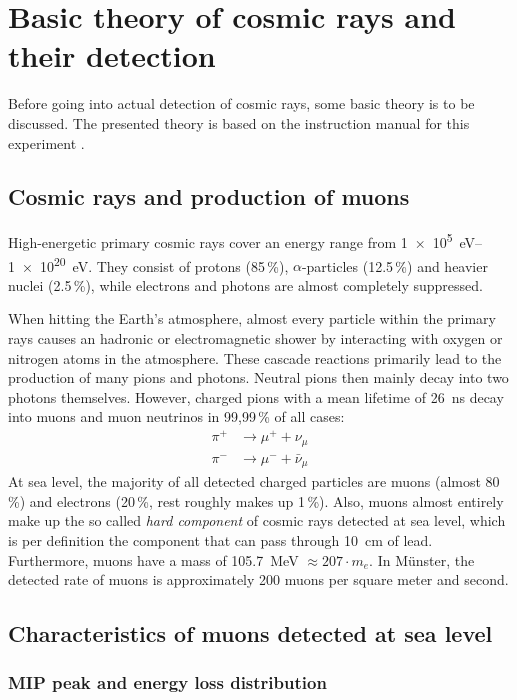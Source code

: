 \section{Basic theory of cosmic rays and their detection}
	
	Before going into actual detection of cosmic rays, some basic theory is to be discussed. The presented theory is based on the instruction manual for this experiment \cite{wwu}.
	

\subsection{Cosmic rays and production of muons}

High-energetic primary cosmic rays cover an energy range from \SIrange{1e5}{1e20}{\electronvolt}.
They consist of protons (85\,\%), $\alpha$-particles (12.5\,\%) and heavier nuclei (2.5\,\%), while electrons and photons are almost completely suppressed.

When hitting the Earth's atmosphere, almost every particle within the primary rays causes an hadronic or electromagnetic shower by interacting with oxygen or nitrogen atoms in the atmosphere.
These cascade reactions primarily lead to the production of many pions and photons.
Neutral pions then mainly decay into two photons themselves.
However, charged pions with a mean lifetime of \SI{26}{\nano\second}\cite{pdg} decay into muons and muon neutrinos in 99,99\,\% of all cases:
\begin{align}
	\pi^+&\longrightarrow \mu^++\nu_\mu\\
	\pi^-&\longrightarrow \mu^-+\bar{\nu}_\mu
\end{align}
At sea level, the majority of all detected charged particles are muons (almost 80\,\%) and electrons (20\,\%, rest roughly makes up 1\,\%).
Also, muons almost entirely make up the so called \emph{hard component} of cosmic rays detected at sea level, which is per definition the component that can pass through \SI{10}{\centi\meter} of lead.
Furthermore, muons have a mass of \SI{105.7}{\mega\electronvolt} $\approx 207 \cdot m_e$.
In Münster, the detected rate of muons is approximately 200 muons per square meter and second.

\subsection{Characteristics of muons detected at sea level}

\subsubsection{MIP peak and energy loss distribution}

